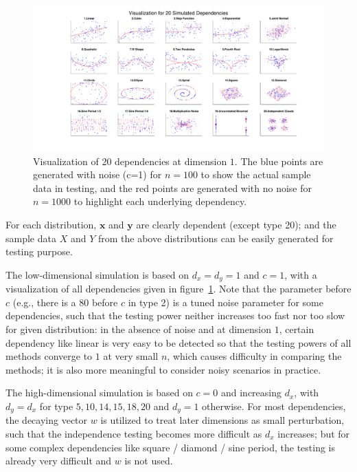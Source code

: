 \documentclass[11pt]{article}
\providecommand{\mb}[1]{\boldsymbol{#1}}
\begin{document}
\begin{figure}[htbp]
\includegraphics[trim={5cm 0 3.5cm 0},clip, width=1.0\textwidth]{../Figures/Fig0}
\caption{Visualization of 20 dependencies at dimension $1$. The blue points are generated with noise (c=1) for $n=100$ to show the actual sample data in testing, and the red points are generated with no noise for $n=1000$ to highlight each underlying dependency.
}
\label{fig0}
\end{figure}

For each distribution, $\mb{x}$ and $\mb{y}$ are clearly dependent (except type 20); and the sample data $X$ and $Y$ from the above distributions can be easily generated for testing purpose.

The low-dimensional simulation is based on $d_{x}=d_{y}=1$ and $c=1$, with a visualization of all dependencies given in figure~\ref{fig0}. Note that the parameter before $c$ (e.g., there is a $80$ before $c$ in type 2) is a tuned noise parameter for some dependencies, such that the testing power neither increases too fast nor too slow for given distribution: in the absence of noise and at dimension $1$, certain dependency like linear is very easy to be detected so that the testing powers of all methods converge to $1$ at very small $n$, which causes difficulty in comparing the methods; it is also more meaningful to consider noisy scenarios in practice. 

The high-dimensional simulation is based on $c=0$ and increasing $d_{x}$, with $d_{y}=d_{x}$ for type $5,10,14,15,18,20$ and $d_{y}=1$ otherwise. For most dependencies, the decaying vector $w$ is utilized to treat later dimensions as small perturbation, such that the independence testing becomes more difficult as $d_{x}$ increases; but for some complex dependencies like square / diamond / sine period, the testing is already very difficult and $w$ is not used.
\end{document}
